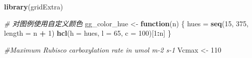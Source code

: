 \documentclass[
]{krantz}
\makeatletter
\newenvironment{Shaded}{\begin{snugshade}}{\end{snugshade}}
\newcommand{\CommentTok}[1]{\textcolor[rgb]{0.56,0.35,0.01}{\textit{#1}}}
\newcommand{\ControlFlowTok}[1]{\textcolor[rgb]{0.13,0.29,0.53}{\textbf{#1}}}
\newcommand{\DataTypeTok}[1]{\textcolor[rgb]{0.13,0.29,0.53}{#1}}
\newcommand{\DecValTok}[1]{\textcolor[rgb]{0.00,0.00,0.81}{#1}}
\newcommand{\KeywordTok}[1]{\textcolor[rgb]{0.13,0.29,0.53}{\textbf{#1}}}
\newcommand{\NormalTok}[1]{#1}
\newcommand{\OperatorTok}[1]{\textcolor[rgb]{0.81,0.36,0.00}{\textbf{#1}}}
\newcommand{\StringTok}[1]{\textcolor[rgb]{0.31,0.60,0.02}{#1}}
\newenvironment{kframe}{%
\medskip{}
\setlength{\fboxsep}{.8em}
 \def\at@end@of@kframe{}%
 \ifinner\ifhmode%
  \def\at@end@of@kframe{\end{minipage}}%
  \begin{minipage}{\columnwidth}%
 \fi\fi%
 \def\FrameCommand##1{\hskip\@totalleftmargin \hskip-\fboxsep
 \colorbox{shadecolor}{##1}\hskip-\fboxsep
     \hskip-\linewidth \hskip-\@totalleftmargin \hskip\columnwidth}%
 \MakeFramed {\advance\hsize-\width
   \@totalleftmargin\z@ \linewidth\hsize
   \@setminipage}}%
 {\par\unskip\endMakeFramed%
 \at@end@of@kframe}
\renewenvironment{Shaded}{\begin{kframe}}{\end{kframe}}
\makeatother
\begin{document}
\begin{Shaded}
\begin{Highlighting}[]
\KeywordTok{library}\NormalTok{(gridExtra)}

\CommentTok{\# 对图例使用自定义颜色}
\NormalTok{gg\_color\_hue \textless{}{-}}\StringTok{ }\ControlFlowTok{function}\NormalTok{(n) \{}
\NormalTok{  hues =}\StringTok{ }\KeywordTok{seq}\NormalTok{(}\DecValTok{15}\NormalTok{, }\DecValTok{375}\NormalTok{, }\DataTypeTok{length =}\NormalTok{ n }\OperatorTok{+}\StringTok{ }\DecValTok{1}\NormalTok{)}
  \KeywordTok{hcl}\NormalTok{(}\DataTypeTok{h =}\NormalTok{ hues, }\DataTypeTok{l =} \DecValTok{65}\NormalTok{, }\DataTypeTok{c =} \DecValTok{100}\NormalTok{)[}\DecValTok{1}\OperatorTok{:}\NormalTok{n]}
\NormalTok{\}}

\CommentTok{\#Maximum Rubisco carboxylation rate in umol m{-}2 s{-}1}
\NormalTok{Vcmax \textless{}{-}}\StringTok{ }\DecValTok{110}


\end{Highlighting}
\end{Shaded}
\end{document}
